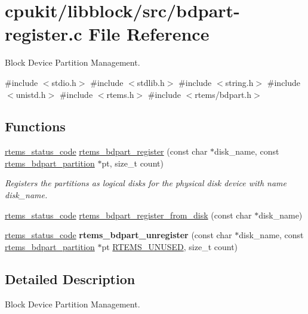 \hypertarget{bdpart-register_8c}{}\section{cpukit/libblock/src/bdpart-\/register.c File Reference}
\label{bdpart-register_8c}


Block Device Partition Management.  


{\ttfamily \#include $<$stdio.\+h$>$}\newline
{\ttfamily \#include $<$stdlib.\+h$>$}\newline
{\ttfamily \#include $<$string.\+h$>$}\newline
{\ttfamily \#include $<$unistd.\+h$>$}\newline
{\ttfamily \#include $<$rtems.\+h$>$}\newline
{\ttfamily \#include $<$rtems/bdpart.\+h$>$}\newline
\subsection*{Functions}
\begin{DoxyCompactItemize}
\item 
\mbox{\hyperlink{group__ClassicStatus_ga545d41846817eaba6143d52ee4d9e9fe}{rtems\+\_\+status\+\_\+code}} \mbox{\hyperlink{group__rtems__bdpart_ga36d215715c22ca86ce71f977ed760f4c}{rtems\+\_\+bdpart\+\_\+register}} (const char $\ast$disk\+\_\+name, const \mbox{\hyperlink{structrtems__bdpart__partition}{rtems\+\_\+bdpart\+\_\+partition}} $\ast$pt, size\+\_\+t count)
\begin{DoxyCompactList}\small\item\em Registers the partitions as logical disks for the physical disk device with name {\itshape disk\+\_\+name}. \end{DoxyCompactList}\item 
\mbox{\hyperlink{group__ClassicStatus_ga545d41846817eaba6143d52ee4d9e9fe}{rtems\+\_\+status\+\_\+code}} \mbox{\hyperlink{group__rtems__bdpart_ga9b0517982a75560e134c808e70885b81}{rtems\+\_\+bdpart\+\_\+register\+\_\+from\+\_\+disk}} (const char $\ast$disk\+\_\+name)
\item 
\mbox{\label{bdpart-register_8c_a56b67f358e96e82c6a6ee4e617ddfee6}} 
\mbox{\hyperlink{group__ClassicStatus_ga545d41846817eaba6143d52ee4d9e9fe}{rtems\+\_\+status\+\_\+code}} {\bfseries rtems\+\_\+bdpart\+\_\+unregister} (const char $\ast$disk\+\_\+name, const \mbox{\hyperlink{structrtems__bdpart__partition}{rtems\+\_\+bdpart\+\_\+partition}} $\ast$pt \mbox{\hyperlink{group__RTEMSScoreBaseDefs_ga6794c0ff237a90e837e19f9bbcae4297}{R\+T\+E\+M\+S\+\_\+\+U\+N\+U\+S\+ED}}, size\+\_\+t count)
\end{DoxyCompactItemize}


\subsection{Detailed Description}
Block Device Partition Management. 

